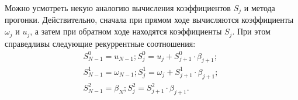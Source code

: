 Можно усмотреть некую аналогию вычисления коэффициентов $S_j$ и метода прогонки. Действительно, сначала при прямом ходе вычисляются коэффициенты $\omega_j$ и $u_j$, а затем при обратном ходе находятся коэффициенты $S_j$. При этом справедливы следующие рекуррентные соотношения:
\begin{eqnarray}
\label{formula624}
S_{N-1}^0 = u_{N-1}; S_j^0 = u_j + S_{j+1}^0 \cdot \beta_{j+1}; \nonumber ~\\
S_{N-1}^1 = \omega_{N-1}; S_j^1 = \omega_j + S_{j+1}^1 \cdot \beta_{j+1}; \nonumber ~\\
S_{N-1}^2 = \beta_N; S_j^2 = S_{j+1}^2 \cdot \beta_{j+1}.
\end{eqnarray}

















